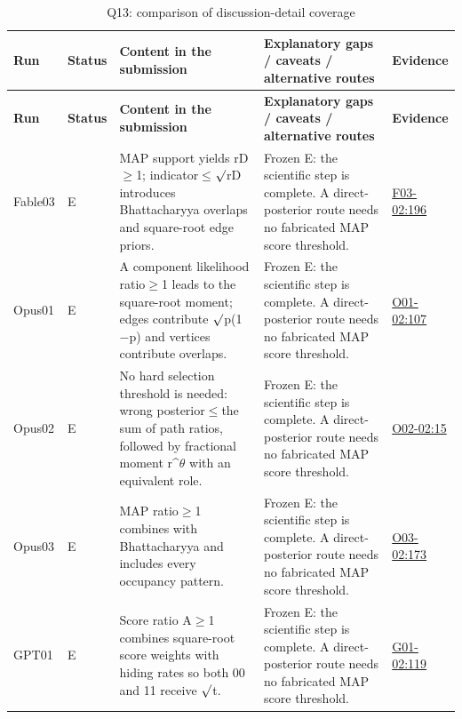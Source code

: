 \documentclass[11pt,a4paper]{article}
\begin{document}
{\fontsize{9.0}{12.6}\selectfont
\setlength{\tabcolsep}{2.5pt}
\begin{longtable}{>{\raggedright\arraybackslash}p{}>{\raggedright\arraybackslash}p{}>{\raggedright\arraybackslash}p{}>{\raggedright\arraybackslash}p{}>{\raggedright\arraybackslash}p{}}
\caption{Q13: comparison of discussion-detail coverage}\\
\toprule
\textbf{Run} & \textbf{Status} & \textbf{Content in the submission} & \textbf{Explanatory gaps /\allowbreak{} caveats /\allowbreak{} alternative routes} & \textbf{Evidence}\tabularnewline
\midrule
\endfirsthead
\toprule
\textbf{Run} & \textbf{Status} & \textbf{Content in the submission} & \textbf{Explanatory gaps /\allowbreak{} caveats /\allowbreak{} alternative routes} & \textbf{Evidence}\tabularnewline
\midrule
\endhead
{}Fable03 & E & MAP support yields rD\ensuremath{\geq}1; indicator\ensuremath{\leq}\ensuremath{\surd}rD introduces Bhattacharyya overlaps and square-root edge priors. & Frozen E: the scientific step is complete. A direct-posterior route needs no fabricated MAP score threshold. & \hyperref[src:F03-02]{F03-02:196}\tabularnewline
{}Opus01 & E & A component likelihood ratio\ensuremath{\geq}1 leads to the square-root moment; edges contribute \ensuremath{\surd}p(1\ensuremath{-}p) and vertices contribute overlaps. & Frozen E: the scientific step is complete. A direct-posterior route needs no fabricated MAP score threshold. & \hyperref[src:O01-02]{O01-02:107}\tabularnewline
{}Opus02 & E & No hard selection threshold is needed: wrong posterior\ensuremath{\leq}the sum of path ratios,\allowbreak{} followed by fractional moment r\textasciicircum{}\ensuremath{\theta} with an equivalent role. & Frozen E: the scientific step is complete. A direct-posterior route needs no fabricated MAP score threshold. & \hyperref[src:O02-02]{O02-02:15}\tabularnewline
{}Opus03 & E & MAP ratio\ensuremath{\geq}1 combines with Bhattacharyya and includes every occupancy pattern. & Frozen E: the scientific step is complete. A direct-posterior route needs no fabricated MAP score threshold. & \hyperref[src:O03-02]{O03-02:173}\tabularnewline
{}GPT01 & E & Score ratio A\ensuremath{\geq}1 combines square-root score weights with hiding rates so both 00 and 11 receive \ensuremath{\surd}t. & Frozen E: the scientific step is complete. A direct-posterior route needs no fabricated MAP score threshold. & \hyperref[src:G01-02]{G01-02:119}\tabularnewline

\end{longtable}}
\end{document}
